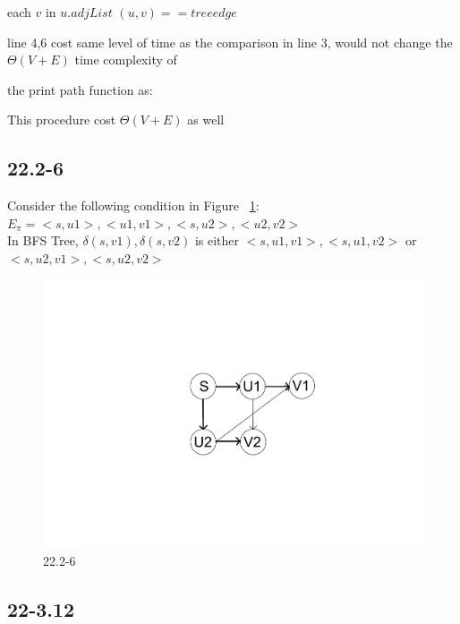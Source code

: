 \documentclass[]{article}
\begin{document}
\begin{codebox}
	
	\li {}
	\li	\For each $v$ in $u.adjList$
	\li \Do \If $(u,v) == treeedge$
	\li 	\Then {}
	\li     {}
	\li 	\Else {}
	\End
	\End
	
\end{codebox}

line 4,6 cost same level of time as the comparison in line 3, would not change the $\Theta(V+E)$ time complexity of 

the print path function as:

This procedure cost $\Theta(V+E)$ as well

\subsection{22.2-6}

Consider the following condition in Figure ~\ref{fig:22.2-6}: \\
$E_{\pi} = <s, u1>, <u1, v1>, <s, u2>, <u2, v2>$\\
In BFS Tree, $\delta (s, v1), \delta (s, v2) $ is either $<s, u1, v1>, <s, u1, v2>$ or $<s, u2, v1>, <s, u2, v2>$

\begin{figure}
	\centering
	\includegraphics[width=\linewidth]{2226}
	\caption{22.2-6}
	\label{fig:22.2-6}
\end{figure}

\subsection{22-3.12}
\end{document}
